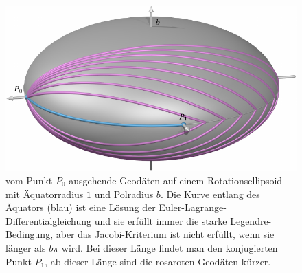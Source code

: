 %
%
%
\begin{figure}
\centering
\includegraphics{chapters/060-variation2/examples/geodesics.pdf}
\caption{vom Punkt $P_0$ ausgehende Geodäten auf einem Rotationsellipsoid
mit Äquatorradius $1$ und Polradius $b$.
Die Kurve entlang des Äquators (blau) ist eine Lösung der
Euler-Lagrange-Differentialgleichung und sie erfüllt immer die starke
Legendre-Bedingung, aber das Jacobi-Kriterium ist nicht erfüllt, wenn 
sie länger als $b\pi$ wird.
Bei dieser Länge findet man den konjugierten Punkt $P_1$, ab
dieser Länge sind die rosaroten Geodäten kürzer.
\label{buch:variation2:fig:geodaeten}}
\end{figure}
